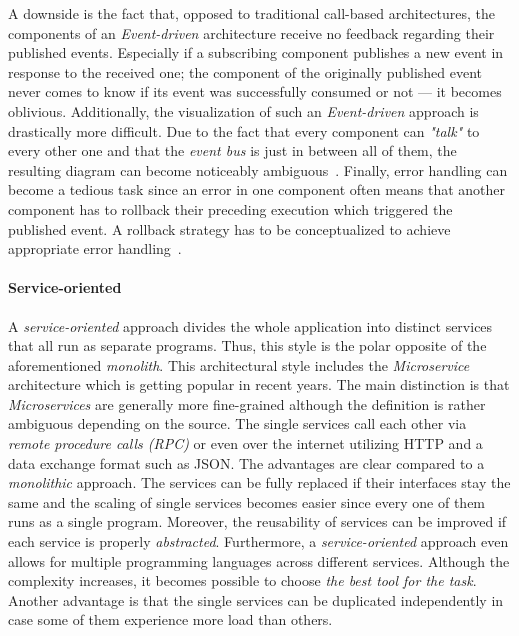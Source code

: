 \documentclass[12pt,a4paper,twoside]{report}
\begin{document}
A downside is the fact that, opposed to traditional call-based architectures,
the components of an \textit{Event-driven} architecture receive no feedback regarding
their published events. Especially if a subscribing component publishes a new event
in response to the received one; the component of the originally published
event never comes to know if its event was successfully consumed or not ---
it becomes oblivious.
Additionally, the visualization of such an \textit{Event-driven} approach
is drastically more difficult. Due to the fact that every component can
\textit{"talk"} to every other one and that the \textit{event bus} is just in between
all of them, the resulting diagram can become noticeably ambiguous~\cite{fairbanks-sa}.
Finally, error handling can become a tedious task since an error in one component
often means that another component has to rollback their preceding execution which
triggered the published event. A rollback strategy has to be conceptualized to
achieve appropriate error handling~\cite{richards-sa-patterns}.

\paragraph{Service-oriented}
A \textit{service-oriented} approach divides the whole application into distinct
services that all run as separate programs. Thus, this style is the
polar opposite of the aforementioned \textit{monolith}.
This architectural style includes the \textit{Microservice} architecture
which is getting popular in recent years. The main distinction is that
\textit{Microservices} are generally more fine-grained although the definition
is rather ambiguous depending on the source.
The single services call each other via
\textit{remote procedure calls (RPC)} or even over the internet utilizing HTTP
and a data exchange format such as JSON.
The advantages are clear compared to a \textit{monolithic} approach.
The services can be fully replaced if their interfaces stay the same and the
scaling of single services becomes easier since every one of them runs as a single program.
Moreover, the reusability of services can be improved if each service is properly \textit{abstracted}.
Furthermore, a \textit{service-oriented} approach even allows for multiple programming languages
across different services. Although the complexity increases, it becomes possible
to choose \textit{the best tool for the task}.
Another advantage is that the single services can be duplicated independently
in case some of them experience more load than others.
\end{document}
